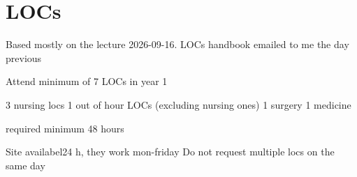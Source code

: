 \chapter{LOCs}

Based mostly on the lecture 2026-09-16. LOCs handbook emailed to me the day previous

Attend minimum of 7 LOCs in year 1

3 nursing locs
1 out of hour LOCs (excluding nursing ones)
1 surgery
1 medicine

required minimum 48 hours

Site availabel24 h, they work mon-friday
Do not request multiple locs on the same day
